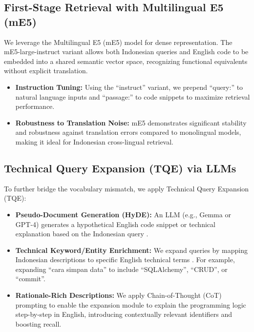 \documentclass[11pt]{article}
\begin{document}
\subsection{First-Stage Retrieval with Multilingual E5 (mE5)}
We leverage the Multilingual E5 (mE5) model \cite{mE52024} for dense representation. The mE5-large-instruct variant allows both Indonesian queries and English code to be embedded into a shared semantic vector space, recognizing functional equivalents without explicit translation. 
\begin{itemize}
    \item \textbf{Instruction Tuning:} Using the ``instruct'' variant, we prepend ``query:'' to natural language inputs and ``passage:'' to code snippets to maximize retrieval performance.
    \item \textbf{Robustness to Translation Noise:} mE5 demonstrates significant stability and robustness against translation errors compared to monolingual models, making it ideal for Indonesian cross-lingual retrieval.
\end{itemize}

\subsection{Technical Query Expansion (TQE) via LLMs}
To further bridge the vocabulary mismatch, we apply Technical Query Expansion (TQE):
\begin{itemize}
    \item \textbf{Pseudo-Document Generation (HyDE):} An LLM (e.g., Gemma or GPT-4) generates a hypothetical English code snippet or technical explanation based on the Indonesian query \cite{query2doc2023}.
    \item \textbf{Technical Keyword/Entity Enrichment:} We expand queries by mapping Indonesian descriptions to specific English technical terms \cite{kar2024}. For example, expanding ``cara simpan data'' to include ``SQLAlchemy'', ``CRUD'', or ``commit''.
    \item \textbf{Rationale-Rich Descriptions:} We apply Chain-of-Thought (CoT) prompting to enable the expansion module to explain the programming logic step-by-step in English, introducing contextually relevant identifiers and boosting recall.
\end{itemize}
\end{document}
